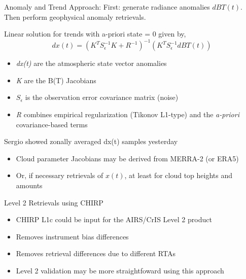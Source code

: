 \documentclass[10pt,t]{beamer}
\begin{document}
\begin{frame}[label={sec:org45e5b50}]{Anomaly and Trend Approach:}
First: generate radiance anomalies \(dBT(t)\).\\
Then perform geophysical anomaly retrievals.\\

\vspace{0.1in}

Linear solution for trends with a-priori state = 0 given by,
\begin{displaymath}
dx(t) =  \left(K^T S_{\epsilon}^{-1} K + R^{-1}\right)^{-1} \left(K^T S_{\epsilon}^{-1} dBT(t)\right)
\end{displaymath}

\begin{itemize}
\item \emph{dx(t)} are the atmospheric state vector anomalies
\item \emph{K} are the B(T) Jacobians
\item \(S_{\epsilon}\) is the observation error covariance matrix (noise)
\item \emph{R} combines empirical regularization (Tikonov L1-type) and the \emph{a-priori} covariance-based terms
\end{itemize}

Sergio showed zonally averaged dx(t) samples yesterday\\

\small
\vspace{0.1in}
\begin{itemize}
\item Cloud parameter Jacobians may be derived from MERRA-2 (or ERA5)
\item Or, if necessary retrievals of \(x(t)\), at least for cloud top heights and amounts
\end{itemize}
\end{frame}

\begin{frame}[label={sec:org4e525e2}]{Level 2 Retrievals using CHIRP}
\begin{itemize}
\item CHIRP L1c could be input for the AIRS/CrIS Level 2 product
\item Removes instrument bias differences
\item Removes retrieval differences due to different RTAs
\item Level 2 validation may be more straightfoward using this approach
\end{itemize}
\end{frame}
\end{document}
